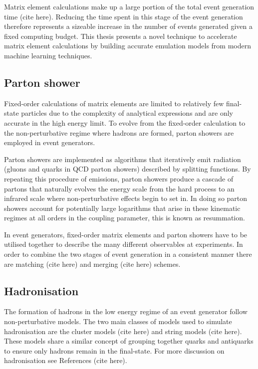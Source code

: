\documentclass[main.tex]{subfiles}
\begin{document}
    Matrix element calculations make up a large
    portion of the total event generation time (cite here).
    Reducing the time spent in this stage of the event
    generation therefore represents a sizeable increase
    in the number of events generated given a fixed computing
    budget. This thesis presents a novel technique to
    accelerate matrix element calculations by building
    accurate emulation models from modern machine learning
    techniques.

    \subsection*{Parton shower}\label{sec:parton_showers}
    Fixed-order calculations of matrix elements are limited
    to relatively few final-state particles due to the complexity
    of analytical expressions and are only accurate in the
    high energy limit. To evolve from the fixed-order
    calculation to the non-perturbative regime where hadrons
    are formed, parton showers are employed in event generators.

    Parton showers are implemented as algorithms that
    iteratively emit radiation (gluons and quarks in QCD
    parton showers) described by splitting functions.
    By repeating this procedure of emissions, parton
    showers produce a cascade of partons that naturally
    evolves the energy scale from the hard process to
    an infrared scale where non-perturbative effects
    begin to set in. In doing so parton showers account
    for potentially large logarithms that arise in
    these kinematic regimes at all orders in the coupling
    parameter, this is known as resummation.

    In event generators, fixed-order matrix elements
    and parton showers have to be utilised together to describe
    the many different observables at experiments. In order
    to combine the two stages of event generation in a consistent
    manner there are matching (cite here) and merging (cite here)
    schemes.

    \subsection*{Hadronisation}\label{sec:hadronisation}
    The formation of hadrons in the low energy regime
    of an event generator follow non-perturbative models.
    The two main classes of models used to simulate
    hadronisation are the cluster models (cite here)
    and string models (cite here).
    These models share a similar concept of grouping together
    quarks and antiquarks to ensure only hadrons remain
    in the final-state. For more discussion on hadronisation
    see References (cite here).
\end{document}
